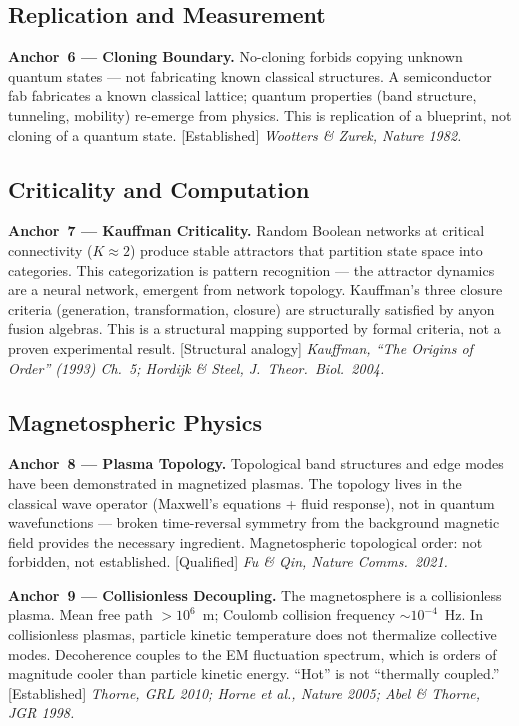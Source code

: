 \subsection*{Replication and Measurement}

\textbf{Anchor~6 --- Cloning Boundary.} No-cloning forbids copying unknown quantum states --- not fabricating known classical structures. A semiconductor fab fabricates a known classical lattice; quantum properties (band structure, tunneling, mobility) re-emerge from physics. This is replication of a blueprint, not cloning of a quantum state. [Established]
\textit{Wootters \& Zurek, Nature 1982.}

\subsection*{Criticality and Computation}

\textbf{Anchor~7 --- Kauffman Criticality.} Random Boolean networks at critical connectivity ($K \approx 2$) produce stable attractors that partition state space into categories. This categorization is pattern recognition --- the attractor dynamics are a neural network, emergent from network topology. Kauffman's three closure criteria (generation, transformation, closure) are structurally satisfied by anyon fusion algebras. This is a structural mapping supported by formal criteria, not a proven experimental result. [Structural analogy]
\textit{Kauffman, ``The Origins of Order'' (1993) Ch.~5; Hordijk \& Steel, J.\ Theor.\ Biol.\ 2004.}

\subsection*{Magnetospheric Physics}

\textbf{Anchor~8 --- Plasma Topology.} Topological band structures and edge modes have been demonstrated in magnetized plasmas. The topology lives in the classical wave operator (Maxwell's equations + fluid response), not in quantum wavefunctions --- broken time-reversal symmetry from the background magnetic field provides the necessary ingredient. Magnetospheric topological order: not forbidden, not established. [Qualified]
\textit{Fu \& Qin, Nature Comms.\ 2021.}

\textbf{Anchor~9 --- Collisionless Decoupling.} The magnetosphere is a collisionless plasma. Mean free path $>10^6$~m; Coulomb collision frequency $\sim 10^{-4}$~Hz. In collisionless plasmas, particle kinetic temperature does not thermalize collective modes. Decoherence couples to the EM fluctuation spectrum, which is orders of magnitude cooler than particle kinetic energy. ``Hot'' is not ``thermally coupled.'' [Established]
\textit{Thorne, GRL 2010; Horne et al., Nature 2005; Abel \& Thorne, JGR 1998.}

